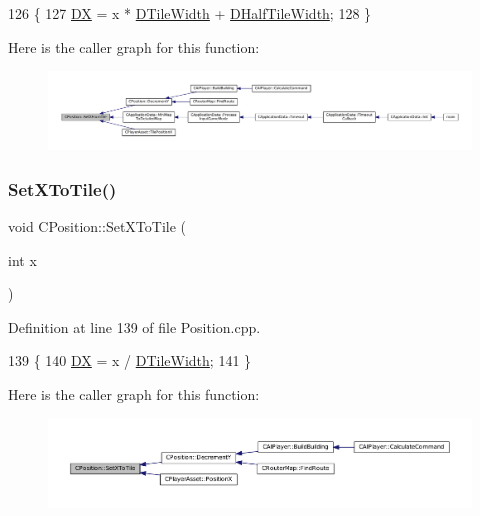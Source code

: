 \begin{DoxyCode}
126                                  \{
127     \hyperlink{classCPosition_a28445f9b872169715919074d82044eda}{DX} = x * \hyperlink{classCPosition_ac17d12fb5d35fcf62d63bb42e8cf7ed6}{DTileWidth} + \hyperlink{classCPosition_a3227e835d9008346e9d91bdad2380f14}{DHalfTileWidth};
128 \}
\end{DoxyCode}
Here is the caller graph for this function\+:\nopagebreak
\begin{figure}[H]
\begin{center}
\leavevmode
\includegraphics[width=350pt]{classCPosition_ac6a1eeaeb98e20942efea7cf253b2ec4_icgraph}
\end{center}
\end{figure}
\hypertarget{classCPosition_a12795d06d34e608697b7b4c9bf202a10}{}\label{classCPosition_a12795d06d34e608697b7b4c9bf202a10} 
\subsubsection{\texorpdfstring{Set\+X\+To\+Tile()}{SetXToTile()}}
{\footnotesize\ttfamily void C\+Position\+::\+Set\+X\+To\+Tile (\begin{DoxyParamCaption}\item[{int}]{x }\end{DoxyParamCaption})}



Definition at line 139 of file Position.\+cpp.


\begin{DoxyCode}
139                                \{
140     \hyperlink{classCPosition_a28445f9b872169715919074d82044eda}{DX} = x / \hyperlink{classCPosition_ac17d12fb5d35fcf62d63bb42e8cf7ed6}{DTileWidth};
141 \}
\end{DoxyCode}
Here is the caller graph for this function\+:\nopagebreak
\begin{figure}[H]
\begin{center}
\leavevmode
\includegraphics[width=350pt]{classCPosition_a12795d06d34e608697b7b4c9bf202a10_icgraph}
\end{center}
\end{figure}
\hypertarget{classCPosition_a4be1caa5ce58297e9d371f6bc1db32d9}{}\label{classCPosition_a4be1caa5ce58297e9d371f6bc1db32d9} 
